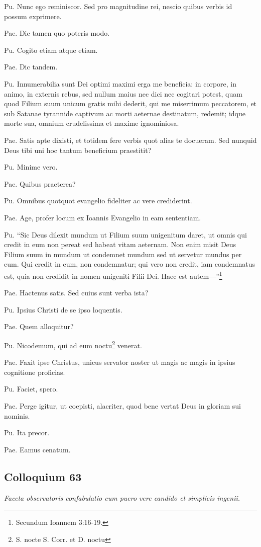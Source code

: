 \documentclass{article}
\begin{document}
Pu. Nunc ego reminiscor. Sed pro magnitudine rei, nescio quibus verbis id possum exprimere. 

Pae. Dic tamen quo poteris modo. 

Pu. Cogito etiam atque etiam. 

Pae. Dic tandem. 

Pu. Innumerabilia sunt Dei optimi maximi erga me beneficia: in corpore, in animo, in externis rebus, sed nullum maius nec dici nec cogitari potest, quam quod Filium suum unicum gratis mihi dederit, qui me miserrimum peccatorem, et sub Satanae tyrannide captivum ac morti aeternae destinatum, redemit; idque morte sua, omnium crudelissima et maxime ignominiosa. 

Pae. Satis apte dixisti, et totidem fere verbis quot alias te docueram. Sed nunquid Deus tibi uni hoc tantum beneficium praestitit?

Pu. Minime vero. 

Pae. Quibus praeterea?

Pu. Omnibus quotquot evangelio fideliter ac vere crediderint. 

Pae. Age, profer locum ex Ioannis Evangelio in eam sententiam. 

Pu. ``Sic Deus dilexit mundum ut Filium suum unigenitum daret, ut omnis qui credit in eum non pereat sed habeat vitam aeternam. Non enim misit Deus Filium suum in mundum ut condemnet mundum sed ut servetur mundus per eum. Qui credit in eum, non condemnatur; qui vero non credit, iam condemnatus est, quia non credidit in nomen unigeniti Filii Dei. Haec est autem---''\footnote{Secundum Ioannem 3:16-19.}

Pae. Hactenus satis. Sed cuius sunt verba ista?

Pu. Ipsius Christi de se ipso loquentis. 

Pae. Quem alloquitur?

Pu. Nicodemum, qui ad eum noctu\footnote{S. nocte S. Corr. et D. noctu} venerat. 

Pae. Faxit ipse Christus, unicus servator noster ut magis ac magis in ipsius cognitione proficias. 

Pu. Faciet, spero. 

Pae. Perge igitur, ut coepisti, alacriter, quod bene vertat Deus in gloriam sui nominis. 

Pu. Ita precor.

Pae. Eamus cenatum.

\subsection{Colloquium 63}
\emph{Faceta observatoris confabulatio cum puero vere candido et simplicis ingenii.}
\end{document}
